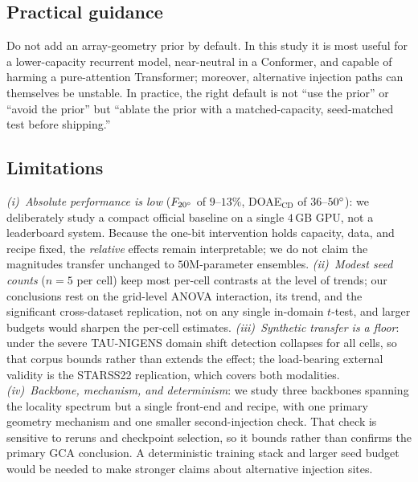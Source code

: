 \subsection{Practical guidance}
Do not add an array-geometry prior by default. In this study it is most useful
for a lower-capacity recurrent model, near-neutral in a Conformer, and capable
of harming a pure-attention Transformer; moreover, alternative injection paths
can themselves be unstable. In practice, the right default is not ``use the
prior'' or ``avoid the prior'' but ``ablate the prior with a matched-capacity,
seed-matched test before shipping.''

\subsection{Limitations}
\label{sec:limitations}
\emph{(i)~Absolute performance is low} ($F_{20^\circ}$ of $9$--$13\%$,
DOAE$_\mathrm{CD}$ of $36$--$50^\circ$): we deliberately study a compact official
baseline on a single $4$\,GB GPU, not a leaderboard system. Because the one-bit
intervention holds capacity, data, and recipe fixed, the \emph{relative} effects
remain interpretable; we do not claim the magnitudes transfer unchanged to
$50$M-parameter ensembles.
\emph{(ii)~Modest seed counts} ($n=5$ per cell) keep most per-cell
contrasts at the level of trends; our conclusions rest on the grid-level ANOVA
interaction, its trend, and the significant cross-dataset replication, not on any
single in-domain $t$-test, and larger budgets would sharpen the per-cell estimates.
\emph{(iii)~Synthetic transfer is a floor}: under the severe TAU-NIGENS domain
shift detection collapses for all cells, so that corpus bounds rather than
extends the effect; the load-bearing external validity is the STARSS22
replication, which covers both modalities.
\emph{(iv)~Backbone, mechanism, and determinism}: we study three backbones
spanning the locality spectrum but a single front-end and recipe, with one
primary geometry mechanism and one smaller second-injection check. That check is
sensitive to reruns and checkpoint selection, so it bounds rather than confirms
the primary GCA conclusion. A deterministic training stack and larger seed budget
would be needed to make stronger claims about alternative injection sites.
